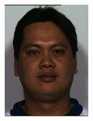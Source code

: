 \begin{figure}[h]
\begin{subfigure}[b]{0.18\textwidth}
         \includegraphics[width=\textwidth]{images/results/base_st/dd121.color.d3_x.png}
     \end{subfigure}
     \hfill
     \begin{subfigure}[b]{0.18\textwidth}
         \centering

\end{subfigure}
\end{figure}
